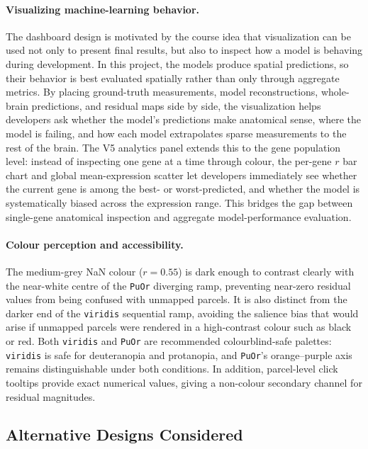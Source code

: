 \documentclass[11pt,letterpaper]{article}
\begin{document}
\paragraph{Visualizing machine-learning behavior.}
The dashboard design is motivated by the course idea that visualization can be
used not only to present final results, but also to inspect how a model is
behaving during development.
In this project, the models produce spatial predictions, so their behavior is
best evaluated spatially rather than only through aggregate metrics.
By placing ground-truth measurements, model reconstructions, whole-brain
predictions, and residual maps side by side, the visualization helps developers
ask whether the model's predictions make anatomical sense, where the model is
failing, and how each model extrapolates sparse measurements to the rest of the
brain.
The V5 analytics panel extends this to the gene population level: instead of
inspecting one gene at a time through colour, the per-gene $r$ bar chart and
global mean-expression scatter let developers immediately see whether the
current gene is among the best- or worst-predicted, and whether the model is
systematically biased across the expression range.
This bridges the gap between single-gene anatomical inspection and
aggregate model-performance evaluation.

\paragraph{Colour perception and accessibility.}
The medium-grey NaN colour ($r{=}0.55$) is dark enough to contrast clearly
with the near-white centre of the \texttt{PuOr} diverging ramp, preventing
near-zero residual values from being confused with unmapped parcels.
It is also distinct from the darker end of the \texttt{viridis} sequential
ramp, avoiding the salience bias that would arise if unmapped parcels were
rendered in a high-contrast colour such as black or red.
Both \texttt{viridis} and \texttt{PuOr} are recommended colourblind-safe
palettes: \texttt{viridis} is safe for deuteranopia and protanopia, and
\texttt{PuOr}'s orange--purple axis remains distinguishable under both
conditions. In addition, parcel-level click tooltips provide exact numerical
values, giving a non-colour secondary channel for residual magnitudes.

\subsection{Alternative Designs Considered}
\end{document}
